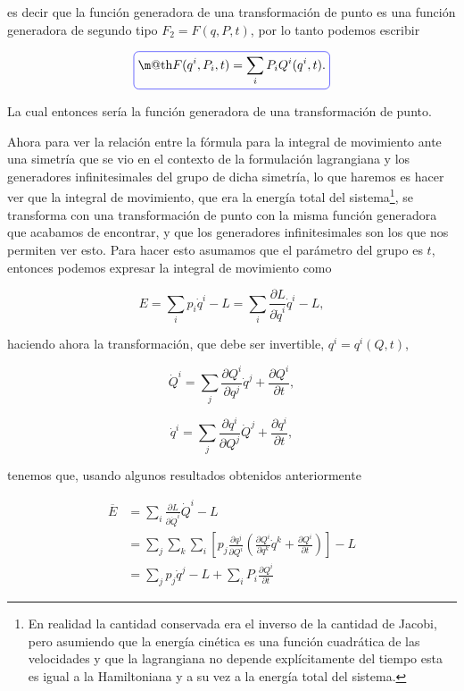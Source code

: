 \documentclass[a4paper,10pt]{article}
\makeatletter
\numberwithin{equation}{section}
\newcommand*{\boxcolor}{blue}
\renewcommand{\boxed}[1]{\textcolor{\boxcolor}{%
\tikz[baseline={([yshift=-1ex]current bounding box.center)}] \node [rectangle, minimum width=1ex,rounded corners,draw] {\normalcolor\m@th$\displaystyle#1$};}}
\makeatother
\begin{document}
es decir que la función generadora de una transformación de punto es una función 
generadora de segundo tipo $F_2 = F(q,P,t)$, por lo tanto podemos escribir 

\begin{equation}
 \boxed{F(q^i,P_i,t) = \sum_i P_i Q^i(q^i,t).}
\end{equation}

La cual entonces sería la función generadora de una transformación de punto.

\vspace{.3cm}

Ahora para ver la relación entre la fórmula para la integral de movimiento ante una
simetría que se vio en el contexto de la formulación lagrangiana y los generadores 
infinitesimales del grupo de dicha simetría, lo que haremos es hacer ver que 
la integral de movimiento, que era la energía total del sistema\footnote{En realidad 
la cantidad conservada era el inverso de la cantidad de Jacobi, pero asumiendo 
que la energía cinética es una función cuadrática de las velocidades y que 
la lagrangiana no depende explícitamente del tiempo esta es igual a la Hamiltoniana 
y a su vez a la energía total del sistema.}, se transforma con una transformación de 
punto con la misma función generadora que acabamos de encontrar, y que los generadores 
infinitesimales son los que nos permiten ver esto. Para hacer esto asumamos que 
el parámetro del grupo es $t$, entonces podemos expresar la integral de movimiento 
como

\begin{equation}
 E = \sum_i p_i\dot{q}^i - L = \sum_i \frac{\partial L}{\partial \dot{q}^i}\dot{q}^i - L,
\end{equation}

haciendo ahora la transformación, que debe ser invertible, $q^i = q^i(Q,t)$,

\begin{equation}
 \dot{Q}^i = \sum_j \frac{\partial Q^i}{\partial q^j}\dot{q}^j + \frac{\partial Q^i}{\partial t},
\end{equation}

\begin{equation}
 \dot{q}^i = \sum_j \frac{\partial q^i}{\partial Q^j}\dot{Q}^j + \frac{\partial q^i}{\partial t},
\end{equation}

tenemos que, usando algunos resultados obtenidos anteriormente

\begin{align*}
 \overline{E} &= \sum_i \frac{\partial L}{\partial \dot{Q}^i}\dot{Q}^i - L \\
 &= \sum_j \sum_k \sum_i \left[p_j\frac{\partial q^j}{\partial Q^i}\left( 
 \frac{\partial Q^i}{\partial q^k}\dot{q}^k + \frac{\partial Q^i}{\partial t}\right)\right] - L \\
 &= \sum_j p_j\dot{q}^j - L + \sum_i P_i \frac{\partial Q^i}{\partial t}
\end{align*}
\end{document}

